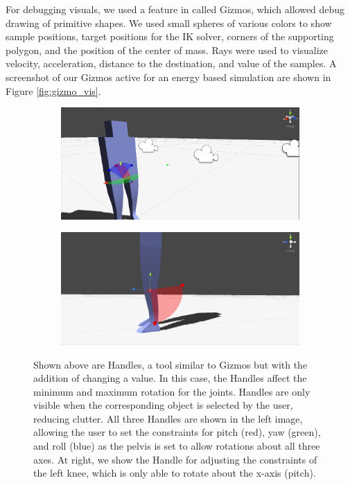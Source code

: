 For debugging visuals, we used a feature in \unity called Gizmos, which allowed debug drawing of primitive shapes.  We used small spheres of various colors to show sample positions, target positions for the IK solver, corners of the supporting polygon, and the position of the center of mass.  Rays were used to visualize velocity, acceleration, distance to the destination, and value of the samples.  A screenshot of our Gizmos active for an energy based simulation are shown in Figure \ref{fig:gizmo_vis}.

\begin{figure}[ht]
	\centering
	\begin{subfigure}[b]{0.49\textwidth}
		\includegraphics[width=\textwidth]{images/handles1.png}
	\end{subfigure}
	\begin{subfigure}[b]{0.49\textwidth}
		\includegraphics[width=\textwidth]{images/handles2.png}
	\end{subfigure}
	\caption[Screenshot of Handles used for setting and visualizing joint constraints in \unity]{Shown above are Handles, a tool similar to Gizmos but with the addition of changing a value.  In this case, the Handles affect the minimum and maximum rotation for the joints.  Handles are only visible when the corresponding object is selected by the user, reducing clutter.  All three Handles are shown in the left image, allowing the user to set the constraints for pitch (red), yaw (green), and roll (blue) as the pelvis is set to allow rotations about all three axes.  At right, we show the Handle for adjusting the constraints of the left knee, which is only able to rotate about the x-axis (pitch).}
	\label{fig:handle_vis}
\end{figure}


